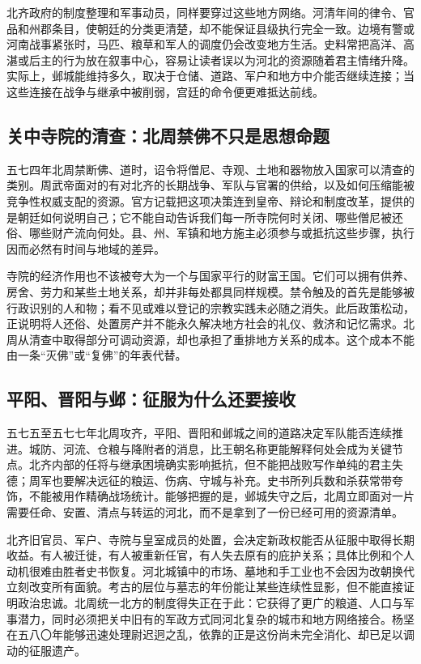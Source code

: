 北齐政府的制度整理和军事动员，同样要穿过这些地方网络。河清年间的律令、官品和州郡条目，使朝廷的分类更清楚，却不能保证县级执行完全一致。边境有警或河南战事紧张时，马匹、粮草和军人的调度仍会改变地方生活。史料常把高洋、高湛或后主的行为放在叙事中心，容易让读者误以为河北的资源随着君主情绪升降。实际上，邺城能维持多久，取决于仓储、道路、军户和地方中介能否继续连接；当这些连接在战争与继承中被削弱，宫廷的命令便更难抵达前线。

\subsection{关中寺院的清查：北周禁佛不只是思想命题}

五七四年北周禁断佛、道时，诏令将僧尼、寺观、土地和器物放入国家可以清查的类别。周武帝面对的有对北齐的长期战争、军队与官署的供给，以及如何压缩能被竞争性权威支配的资源。官方记载把这项决策连到皇帝、辩论和制度改革，提供的是朝廷如何说明自己；它不能自动告诉我们每一所寺院何时关闭、哪些僧尼被还俗、哪些财产流向何处。县、州、军镇和地方施主必须参与或抵抗这些步骤，执行因而必然有时间与地域的差异。

寺院的经济作用也不该被夸大为一个与国家平行的财富王国。它们可以拥有供养、房舍、劳力和某些土地关系，却并非每处都具同样规模。禁令触及的首先是能够被行政识别的人和物；看不见或难以登记的宗教实践未必随之消失。此后政策松动，正说明将人还俗、处置房产并不能永久解决地方社会的礼仪、救济和记忆需求。北周从清查中取得部分可调动资源，却也承担了重排地方关系的成本。这个成本不能由一条“灭佛”或“复佛”的年表代替。

\subsection{平阳、晋阳与邺：征服为什么还要接收}

五七五至五七七年北周攻齐，平阳、晋阳和邺城之间的道路决定军队能否连续推进。城防、河流、仓粮与降附者的消息，比王朝名称更能解释何处会成为关键节点。北齐内部的任将与继承困境确实影响抵抗，但不能把战败写作单纯的君主失德；周军也要解决远征的粮运、伤病、守城与补充。史书所列兵数和杀获常带夸饰，不能被用作精确战场统计。能够把握的是，邺城失守之后，北周立即面对一片需要任命、安置、清点与转运的河北，而不是拿到了一份已经可用的资源清单。

北齐旧官员、军户、寺院与皇室成员的处置，会决定新政权能否从征服中取得长期收益。有人被迁徙，有人被重新任官，有人失去原有的庇护关系；具体比例和个人动机很难由胜者史书恢复。河北城镇中的市场、墓地和手工业也不会因为改朝换代立刻改变所有面貌。考古的层位与墓志的年份能让某些连续性显影，但不能直接证明政治忠诚。北周统一北方的制度得失正在于此：它获得了更广的粮道、人口与军事潜力，同时必须把关中旧有的军政方式同河北复杂的城市和地方网络接合。杨坚在五八〇年能够迅速处理尉迟迥之乱，依靠的正是这份尚未完全消化、却已足以调动的征服遗产。

